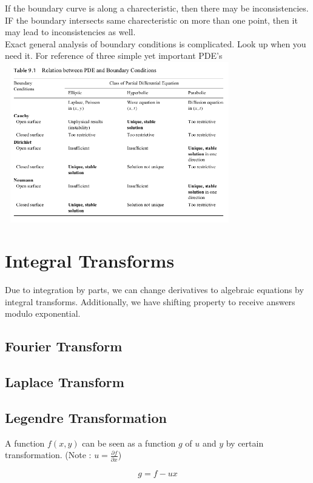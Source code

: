 \documentclass{report}
\begin{document}
\noindent If the boundary curve is along a charecteristic, then there may be inconsistencies. IF the boundary intersects same charecteristic on more than one point, then it may lead to inconsistencies as well.\\

\noindent Exact general analysis of boundary conditions is complicated. Look up when you need it. For reference of three simple yet important PDE's\\

\includegraphics[width=10cm, height=7cm]{./Images/boundary.png}

\section{Integral Transforms}
Due to integration by parts, we can change derivatives to algebraic equations by integral transforms. Additionally, we have shifting property to receive answers modulo exponential.

\subsection{Fourier Transform}

\subsection{Laplace Transform}

\subsection{Legendre Transformation}
A function $f(x,y)$ can be seen as a function $g$ of $u$ and $y$ by certain transformation. (Note : $u=\frac{\partial f}{\partial x}$)

$$g = f - ux$$
\end{document}
